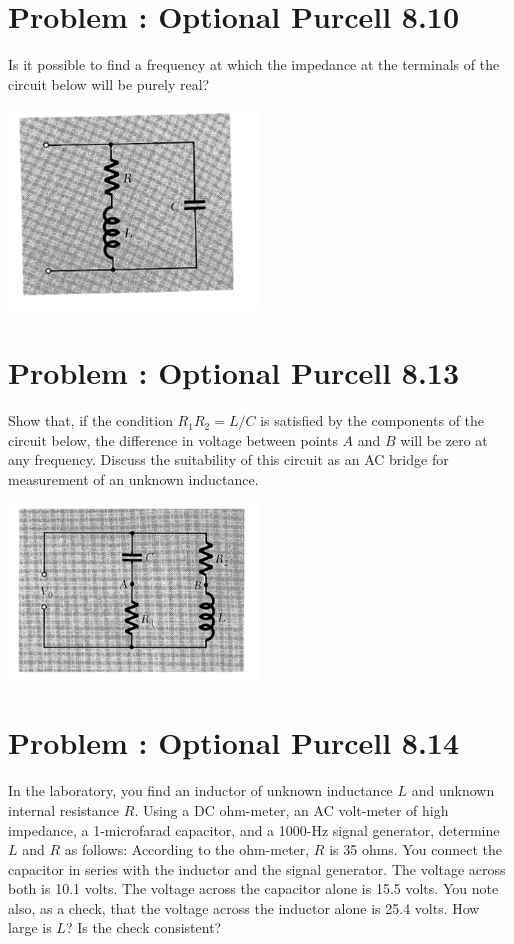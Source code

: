 \documentclass[problems]{esg8022pset}
\begin{document}
\section{Problem \thesection: Optional Purcell 8.10}
  Is it possible to find a frequency at which the impedance at the
  terminals of the circuit below will be purely real?

  \begin{center}
    \includegraphics[width = 0.5\textwidth]{figpu810}
  \end{center}
\section{Problem \thesection: Optional Purcell 8.13}
  Show that, if the condition $R_1R_2 = L / C$ is satisfied by the
  components of the circuit below, the difference in voltage between points
  $A$ and $B$ will be zero at any frequency.  Discuss the suitability of
  this circuit as an AC bridge for measurement of an unknown inductance.

  \begin{center}
    \includegraphics[width = 0.5\textwidth]{figpu813}
  \end{center}
\section{Problem \thesection: Optional Purcell 8.14}
  In the laboratory, you find an inductor of unknown inductance $L$ and
  unknown internal resistance $R$.  Using a DC ohm-meter, an AC volt-meter
  of high impedance, a 1-microfarad capacitor, and a 1000-Hz signal
  generator, determine $L$ and $R$ as follows: According to the ohm-meter,
  $R$ is 35 ohms.  You connect the capacitor in series with the inductor
  and the signal generator.  The voltage across both is 10.1 volts.  The
  voltage across the capacitor alone is 15.5 volts. You note also, as a
  check, that the voltage across the inductor alone is 25.4 volts.  How
  large is $L$?  Is the check consistent?
\end{document}
